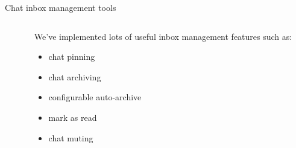 \documentclass{beeper}
\begin{document}
\begin{frame}{Chat inbox management tools}
\begin{columns}
\begin{column}{0.3\textwidth}
        \end{column}
        \begin{column}{0.7\textwidth}
            We've implemented lots of useful inbox management features such as:
            \begin{itemize}
                \item chat pinning
                \item chat archiving
                \item configurable auto-archive
                \item mark as read
                \item chat muting
            \end{itemize}
        \end{column}
    \end{columns}
\end{frame}
\end{document}
